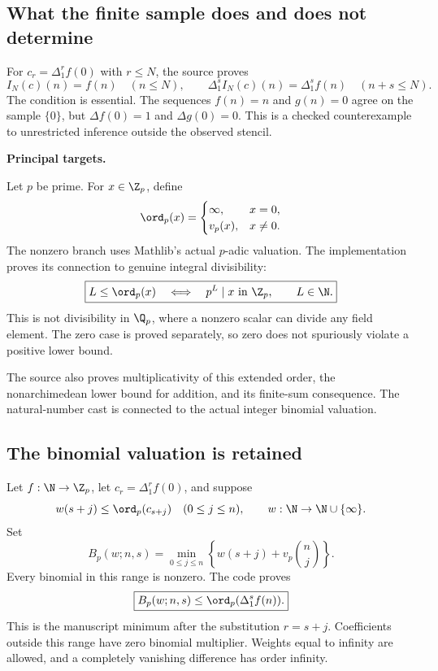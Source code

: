 \subsection*{What the finite sample does and does not determine}
For $c_r=\Delta_1^r f(0)$ with $r\leq N$, the source proves
\[
 I_N(c)(n)=f(n)\quad(n\leq N),\qquad
 \Delta_1^s I_N(c)(n)=\Delta_1^s f(n)\quad(n+s\leq N).
\]
The condition is essential. The sequences $f(n)=n$ and $g(n)=0$ agree on the sample $\{0\}$, but $\Delta f(0)=1$ and $\Delta g(0)=0$. This is a checked counterexample to unrestricted inference outside the observed stencil.

\textbf{Principal targets.}\par
{}\par
{}
\par\medskip
{}
Let $p$ be prime. For $x\in\Z_p$, define
\[
 \ord_p(x)=\begin{cases}\infty,&x=0,\\v_p(x),&x\neq0.\end{cases}
\]
The nonzero branch uses Mathlib's actual $p$-adic valuation. The implementation proves its connection to genuine integral divisibility:
\[
 \boxed{L\leq\ord_p(x)\quad\Longleftrightarrow\quad p^L\mid x
 \ \text{in }\Z_p,\qquad L\in\N.}
\]
This is not divisibility in $\Q_p$, where a nonzero scalar can divide any field element. The zero case is proved separately, so zero does not spuriously violate a positive lower bound.

The source also proves multiplicativity of this extended order, the nonarchimedean lower bound for addition, and its finite-sum consequence. The natural-number cast is connected to the actual integer binomial valuation.

\subsection*{The binomial valuation is retained}
Let $f:\N\to\Z_p$, let $c_r=\Delta_1^r f(0)$, and suppose
\[
 w(s+j)\leq\ord_p(c_{s+j})\quad(0\leq j\leq n),
 \qquad w:\N\to\N\cup\{\infty\}.
\]
Set
\[
 B_p(w;n,s)=\min_{0\leq j\leq n}
 \left\{w(s+j)+v_p\!\binom nj\right\}.
\]
Every binomial in this range is nonzero. The code proves
\[
 \boxed{B_p(w;n,s)\leq\ord_p(\Delta_1^s f(n)).}
\]
This is the manuscript minimum after the substitution $r=s+j$. Coefficients outside this range have zero binomial multiplier. Weights equal to infinity are allowed, and a completely vanishing difference has order infinity.

